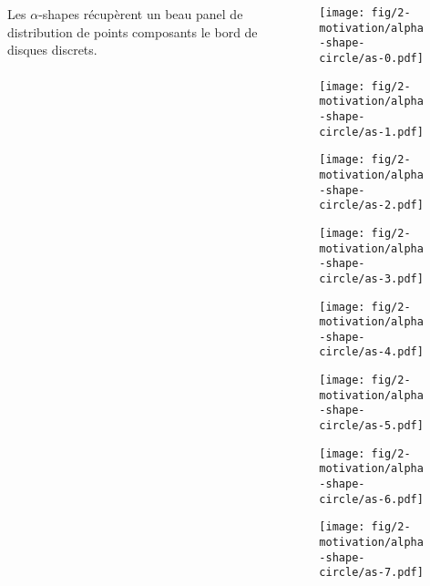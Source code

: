 \begin{frame}
\begin{columns}[t]
\begin{column}{4cm}
      {
        \begin{block}{}
          Les $\alpha$-shapes récupèrent un beau panel de distribution de points composants le bord de disques discrets.
        \end{block}
      }
      
    \end{column}

    \begin{column}{6cm}
      \vspace{-0.8cm}     
      {
        \begin{figure}[h!]
          \centering
          \texttt{[image: fig/2-motivation/alpha-shape-circle/as-0.pdf]}
        \end{figure}
      }
      {
        \begin{figure}[h!]
          \centering
          \texttt{[image: fig/2-motivation/alpha-shape-circle/as-1.pdf]}
        \end{figure}
      }
      {
        \begin{figure}[h!]
          \centering
          \texttt{[image: fig/2-motivation/alpha-shape-circle/as-2.pdf]}
        \end{figure}
      }
      {
        \begin{figure}[h!]
          \centering
          \texttt{[image: fig/2-motivation/alpha-shape-circle/as-3.pdf]}
        \end{figure}
      }
      {
        \begin{figure}[h!]
          \centering
          \texttt{[image: fig/2-motivation/alpha-shape-circle/as-4.pdf]}
        \end{figure}
      }
      {
        \begin{figure}[h!]
          \centering
          \texttt{[image: fig/2-motivation/alpha-shape-circle/as-5.pdf]}
        \end{figure}
      }
      {
        \begin{figure}[h!]
          \centering
          \texttt{[image: fig/2-motivation/alpha-shape-circle/as-6.pdf]}
        \end{figure}
      }
      {
        \begin{figure}[h!]
          \centering
          \texttt{[image: fig/2-motivation/alpha-shape-circle/as-7.pdf]}

\end{figure}}
\end{column}
\end{columns}
\end{frame}

